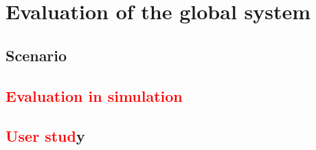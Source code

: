 \documentclass[english,a4paper,11pt,twoside]{StyleThese}
\begin{document}
\setcounter{chapter}{4} %
\dominitoc
\faketableofcontents
\fi

\chapter{Evaluation of the global system}
\minitoc

\label{ch:Eval}

\section{Scenario}

\section{\textcolor{red}{Evaluation in simulation}}

\section{\textcolor{red}{User stud}y}


\ifdefined{}
\else


\end{document}
